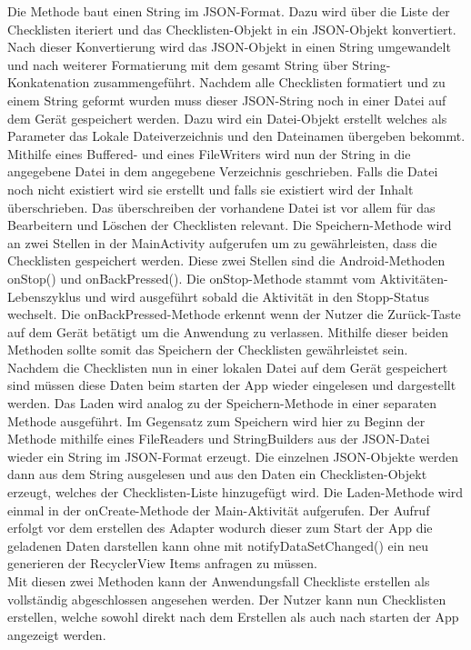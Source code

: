 Die Methode baut einen String im \ac{JSON}-Format. Dazu wird über die Liste der Checklisten iteriert und das Checklisten-Objekt in ein \ac{JSON}-Objekt konvertiert. Nach dieser Konvertierung wird das \ac{JSON}-Objekt in einen String umgewandelt und nach weiterer Formatierung mit dem gesamt String über String-Konkatenation zusammengeführt. Nachdem alle Checklisten formatiert und zu einem String geformt wurden muss dieser \glqq \ac{JSON}-String\grqq{} noch in einer Datei auf dem Gerät gespeichert werden. Dazu wird ein Datei-Objekt erstellt welches als Parameter das Lokale Dateiverzeichnis und den Dateinamen übergeben bekommt. Mithilfe eines Buffered- und eines FileWriters wird nun der String in die angegebene Datei in dem angegebene Verzeichnis geschrieben. Falls die Datei noch nicht existiert wird sie erstellt und falls sie existiert wird der Inhalt überschrieben. Das überschreiben der vorhandene Datei ist vor allem für das Bearbeitern und Löschen der Checklisten relevant. Die Speichern-Methode wird an zwei Stellen in der MainActivity aufgerufen um zu gewährleisten, dass die Checklisten gespeichert werden. Diese zwei Stellen sind die Android-Methoden onStop() und onBackPressed(). Die onStop-Methode stammt vom Aktivitäten-Lebenszyklus und wird ausgeführt sobald die Aktivität in den Stopp-Status wechselt. Die onBackPressed-Methode erkennt wenn der Nutzer die Zurück-Taste auf dem Gerät betätigt um die Anwendung zu verlassen. Mithilfe dieser beiden Methoden sollte somit das Speichern der Checklisten gewährleistet sein.\\
Nachdem die Checklisten nun in einer lokalen Datei auf dem Gerät gespeichert sind müssen diese Daten beim starten der App wieder eingelesen und dargestellt werden. Das Laden wird analog zu der Speichern-Methode in einer separaten Methode ausgeführt. Im Gegensatz zum Speichern wird hier zu Beginn der Methode mithilfe eines FileReaders und StringBuilders aus der \ac{JSON}-Datei wieder ein String im \ac{JSON}-Format erzeugt. Die einzelnen \ac{JSON}-Objekte werden dann aus dem String ausgelesen und aus den Daten ein Checklisten-Objekt erzeugt, welches der Checklisten-Liste hinzugefügt wird. Die Laden-Methode wird einmal in der onCreate-Methode der Main-Aktivität aufgerufen. Der Aufruf erfolgt vor dem erstellen des Adapter wodurch dieser zum Start der App die geladenen Daten darstellen kann ohne mit notifyDataSetChanged() ein neu generieren der RecyclerView Items anfragen zu müssen.\\
Mit diesen zwei Methoden kann der Anwendungsfall \glqq Checkliste erstellen\grqq{} als vollständig abgeschlossen angesehen werden. Der Nutzer kann nun Checklisten erstellen, welche sowohl direkt nach dem Erstellen als auch nach starten der App angezeigt werden.


